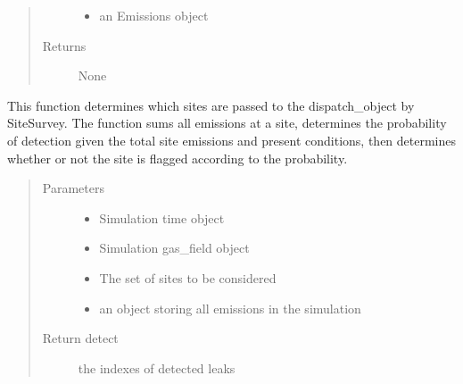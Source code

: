 \documentclass[letterpaper,10pt,english]{sphinxmanual}
\begin{document}
\begin{fulllineitems}
\begin{fulllineitems}
\begin{quote}
\begin{description}
\begin{itemize}
\item {} 
 \textendash{} an Emissions object

\end{itemize}

\item[{Returns}] \leavevmode
None

\end{description}\end{quote}

\end{fulllineitems}


\begin{fulllineitems}
\label{\detokenize{index:feast.DetectionModules.site_survey.SiteSurvey.detect_prob_curve}}
This function determines which sites are passed to the dispatch\_object by SiteSurvey.  The function sums all
emissions at a site, determines the probability of detection given the total site emissions and present
conditions, then determines whether or not the site is flagged according to the probability.
\begin{quote}\begin{description}
\item[{Parameters}] \leavevmode\begin{itemize}
\item {} 
 \textendash{} Simulation time object

\item {} 
 \textendash{} Simulation gas\_field object

\item {} 
 \textendash{} The set of sites to be considered

\item {} 
 \textendash{} an object storing all emissions in the simulation

\end{itemize}

\item[{Return detect}] \leavevmode
the indexes of detected leaks


\end{description}
\end{quote}
\end{fulllineitems}
\end{fulllineitems}
\end{document}

